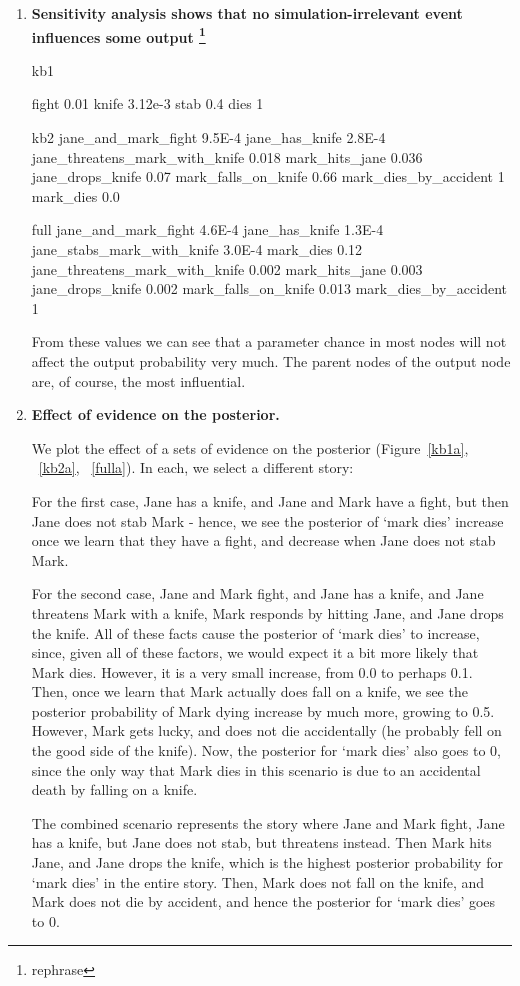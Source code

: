 \begin{enumerate}
\item \textbf{Sensitivity analysis shows that no simulation-irrelevant event influences some output \footnote{rephrase}}

kb1

fight 0.01
knife 3.12e-3
stab 0.4
dies 1


kb2
jane\_and\_mark\_fight	9.5E-4	
jane\_has\_knife	2.8E-4	
jane\_threatens\_mark\_with\_knife	0.018
mark\_hits\_jane	0.036
jane\_drops\_knife	0.07
mark\_falls\_on\_knife	0.66	
mark\_dies\_by\_accident	1	
mark\_dies	0.0


full
jane\_and\_mark\_fight 	4.6E-4	
jane\_has\_knife	1.3E-4	
jane\_stabs\_mark\_with\_knife	3.0E-4	
mark\_dies 0.12	
jane\_threatens\_mark\_with\_knife	0.002
mark\_hits\_jane	0.003
jane\_drops\_knife	0.002
mark\_falls\_on\_knife	0.013
mark\_dies\_by\_accident	1

From these values we can see that a parameter chance in most nodes will not affect the output probability very much. The parent nodes of the output node are, of course, the most influential. 


\item \textbf{Effect of evidence on the posterior.}

We plot the effect of a sets of evidence on the posterior (Figure~\ref{kb1a}, ~\ref{kb2a}, ~\ref{fulla}). In each, we select a different story: 

For the first case, Jane has a knife, and Jane and Mark have a fight, but then Jane does not stab Mark - hence, we see the posterior of `mark dies' increase once we learn that they have a fight, and decrease when Jane does not stab Mark.

For the second case, Jane and Mark fight, and Jane has a knife, and Jane threatens Mark with a knife, Mark responds by hitting Jane, and Jane drops the knife. All of these facts cause the posterior of `mark dies' to increase, since, given all of these factors, we would expect it a bit more likely that Mark dies. However, it is a very small increase, from 0.0 to perhaps 0.1. Then, once we learn that Mark actually does fall on a knife, we see the posterior probability of Mark dying increase by much more, growing to 0.5. However, Mark gets lucky, and does not die accidentally (he probably fell on the good side of the knife). Now, the posterior for `mark dies' also goes to 0, since the only way that Mark dies in this scenario is due to an accidental death by falling on a knife. 

The combined scenario represents the story where Jane and Mark fight, Jane has a knife, but Jane does not stab, but threatens instead. Then Mark hits Jane, and Jane drops the knife, which is the highest posterior probability for `mark dies' in the entire story. Then, Mark does not fall on the knife, and Mark does not die by accident, and hence the posterior for `mark dies' goes to 0.


\end{enumerate}
